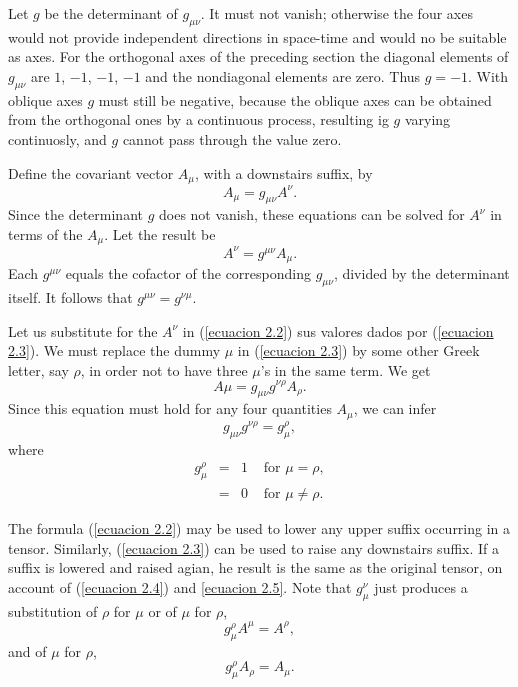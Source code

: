 Let $g$ be the determinant of $g_{\mu\nu}$. It must not vanish; otherwise the 
four axes would not provide independent directions in space-time and would no be 
suitable as axes. For the orthogonal axes of the preceding section the diagonal 
elements of $g_{\mu\nu}$ are $1$, $-1$, $-1$, $-1$ and the nondiagonal elements 
are zero. Thus $g=-1$. With oblique axes $g$ must still be negative, because the 
oblique axes can be obtained from the orthogonal ones by a continuous process, 
resulting ig $g$ varying continuosly, and $g$ cannot pass through the value 
zero.

Define the covariant vector $A_\mu$, with a downstairs suffix, by
\begin{equation}
 \label{ecuacion 2.2}
 A_\mu = g_{\mu\nu} A^\nu.
\end{equation}
 Since the determinant $g$ does not vanish, these equations can be solved for 
$A^\nu$ in terms of the $A_\mu$. Let the result be
\begin{equation}
 \label{ecuacion 2.3}
 A^\nu = g^{\mu\nu} A_\mu.
\end{equation}
Each $g^{\mu\nu}$ equals the cofactor of the corresponding $g_{\mu\nu}$, 
divided by the determinant itself. It follows that $g^{\mu\nu} = g^{\nu\mu}$.

Let us substitute for the $A^\nu$ in (\ref{ecuacion 2.2}) sus valores dados por 
(\ref{ecuacion 2.3}). We must replace the dummy $\mu$ in (\ref{ecuacion 2.3}) by 
some other Greek letter, say $\rho$, in order not to have three $\mu$'s in the 
same term. We get
\[
 A\mu = g_{\mu\nu} g^{\nu\rho}A_\rho.
\]
Since this equation must hold for any four quantities $A_\mu$, we can infer 
\begin{equation}
 \label{ecuacion 2.4}
 g_{\mu\nu} g^{\nu\rho} = g_{\mu}^{\rho},
\end{equation}
where
\begin{equation}
 \label{ecuacion 2.5}
 \begin{array}{rclr}
    g_{\mu}^{\rho} & = & 1 & \mbox{ for } \mu = \rho,\\
                   & = & 0 & \mbox{ for } \mu \ne \rho.
 \end{array}
\end{equation}

The formula (\ref{ecuacion 2.2}) may be used to lower any upper suffix 
occurring in a tensor. Similarly, (\ref{ecuacion 2.3}) can be used to raise any 
downstairs suffix. If a suffix is lowered and raised agian, he result is the 
same as the original tensor, on account of (\ref{ecuacion 2.4}) and 
\ref{ecuacion 2.5}. Note that $g_{\mu}^{\nu}$ just produces a substitution of 
$\rho$ for $\mu$ or of $\mu$ for $\rho$,
\[
 g_{\mu}^{\rho} A^{\mu} = A^{\rho},
\]
and of $\mu$ for $\rho$,
\[
 g_{\mu}^{\rho} A_{\rho} = A_{\mu}.
\]


